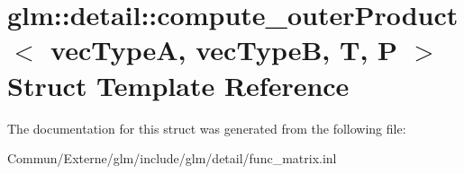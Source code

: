 \hypertarget{structglm_1_1detail_1_1compute__outer_product}{}\section{glm\+:\+:detail\+:\+:compute\+\_\+outer\+Product$<$ vec\+TypeA, vec\+TypeB, T, P $>$ Struct Template Reference}
\label{structglm_1_1detail_1_1compute__outer_product}


The documentation for this struct was generated from the following file\+:\begin{DoxyCompactItemize}
\item 
Commun/\+Externe/glm/include/glm/detail/func\+\_\+matrix.\+inl\end{DoxyCompactItemize}
